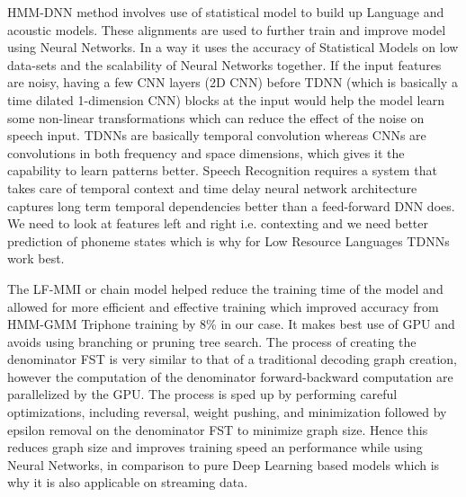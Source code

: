 \documentclass{article}
\begin{document}
HMM-DNN method involves use of statistical model to build up Language and acoustic models. These alignments are used to further train and improve model using Neural Networks. In a way it uses the accuracy of Statistical Models on low data-sets and the scalability of Neural Networks together. If the input features are noisy, having a few CNN layers (2D CNN) before TDNN (which is basically a time dilated 1-dimension CNN) blocks at the input would help the model learn some non-linear transformations which can reduce the effect of the noise on speech input. TDNNs are basically temporal convolution whereas CNNs are convolutions in both frequency and space dimensions, which gives it the capability to learn patterns better. Speech Recognition requires a system that takes care of temporal context and time delay neural network architecture captures long term temporal dependencies better than a feed-forward DNN does. We need to look at features left and right i.e. contexting and we need better prediction of phoneme states which is why for Low Resource Languages TDNNs work best. 

The LF-MMI or chain model helped reduce the training time of the model and allowed for more efficient and effective training which improved accuracy from HMM-GMM Triphone training by 8\% in our case. It makes best use of GPU and avoids using branching or pruning tree search. The process of creating the denominator FST is very similar to that of a traditional decoding graph creation, however the computation of the denominator forward-backward computation are parallelized by the GPU. The process is sped up by performing careful optimizations, including reversal, weight pushing, and minimization followed by epsilon removal on the denominator FST to minimize graph size. Hence this reduces graph size and improves training speed an performance while using Neural Networks, in comparison to pure Deep Learning based models which is why it is also applicable on streaming data.

\end{document}
